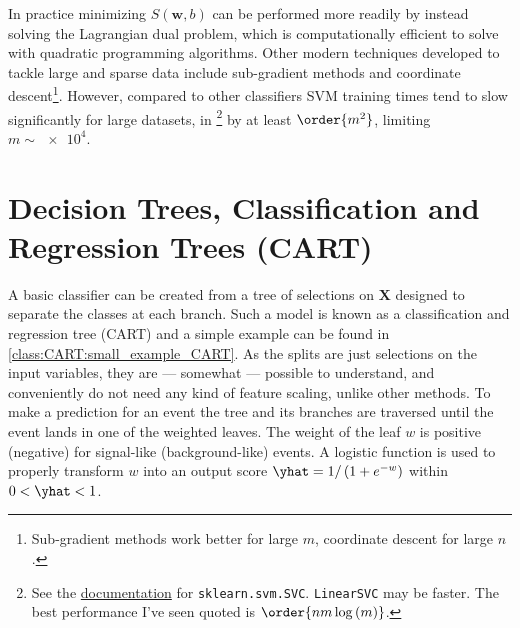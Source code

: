 In practice minimizing $S\left(\mathbf{w}, b\right)$ can be
performed more readily by instead solving the Lagrangian dual problem,
which is computationally efficient to solve with quadratic programming algorithms.
Other modern techniques developed to tackle large and sparse data include
sub-gradient methods and coordinate descent\footnote{Sub-gradient methods work better for large $m$,
coordinate descent for large $n$.}.
However, compared to other classifiers SVM training times
tend to slow significantly for large datasets,
in \sklearn\footnote{See the
\href{https://scikit-learn.org/stable/modules/generated/sklearn.svm.SVC.html}{documentation}
for \texttt{sklearn.svm.SVC}.
\texttt{LinearSVC} may be faster.
The best performance I've seen quoted is $\order{n m \log{\left(m\right)}}$.} by
at least $\order{m^{2}}$, limiting $m \sim \num{e4}$.


\section{Decision Trees, \texorpdfstring{\ie}{ie} Classification and Regression Trees (CART)}
\label{class:CART}

A basic classifier can be created from a tree of selections on $\mathbf{X}$ designed to
separate the classes at each branch.
Such a model is known as a classification and regression tree (CART) \cite{Breiman:2253780}
and a simple example can be found in \cref{class:CART:small_example_CART}.
As the splits are just selections on the input variables,
they are --- somewhat --- possible to understand,
and conveniently do not need any kind of feature scaling, unlike other methods.
To make a prediction for an event the tree and its branches are traversed
until the event lands in one of the weighted leaves.
The weight of the leaf $w$ is positive (negative) for signal-like (background-like) events.
A logistic function is used to properly transform $w$ into an output score
$\yhat = 1 /\left(1+e^{-w}\right)$ within $0 < \yhat < 1$.

